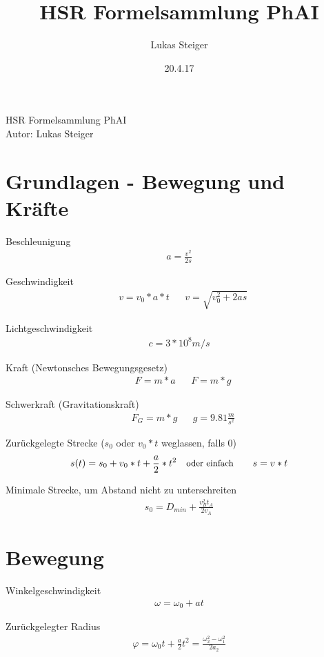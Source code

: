 \documentclass[17pt]{extarticle}
\author{Lukas Steiger}
\title{HSR Formelsammlung PhAI}
\date{20.4.17}
\begin{document}
\begin{center}
	\huge{HSR Formelsammlung PhAI} \\
	\small{Autor: Lukas Steiger}
\end{center}
	
\section{Grundlagen - Bewegung und Kräfte}

	Beschleunigung
	\begin{align}
		a = \frac{v^{2}}{2 s}
	\end{align}

	Geschwindigkeit
	\begin{align}
		&v = v_{0} * a * t
		&&v = \sqrt{ v_{0}^2 + 2 a s }
	\end{align}
	
	Lichtgeschwindigkeit
	\begin{align}
		c = 3 * 10^{8} m/s
	\end{align}
	
	Kraft \small{(Newtonsches Bewegungsgesetz)}
	\begin{align}
		&F = m * a
		&&F = m * g
	\end{align}
	
	Schwerkraft \small{(Gravitationskraft)}
	\begin{align}
		&F_{G} = m * g
		&&g = 9.81 \frac{m}{s^{2}} 
	\end{align}
	
	Zurückgelegte Strecke \small{($s_{0}$ oder $v_{0}*t$ weglassen, falls 0)}
	\begin{align}
		&s(t) = s_{0} + v_{0} * t + \frac{a}{2} * t^{2}
		&&\text{\small{oder einfach}}
		&&&s = v * t
	\end{align}
	
	Minimale Strecke, um Abstand nicht zu unterschreiten
	\begin{align}
		s_{0} = D_{min} + \frac{v_{B}^2 t_{A}}{2 v_{A}}
	\end{align}
	
	
	\section{Bewegung}
	Winkelgeschwindigkeit
	\begin{align}
		\omega = \omega_{0} + at
	\end{align}
	
	Zurückgelegter Radius
	\begin{align}
		\varphi = \omega_{0}t + \frac{a}{2}t^2 = \frac{\omega_{2}^2 - \omega_{1}^2}{2a_{2}}
	\end{align}
	
\end{document}
